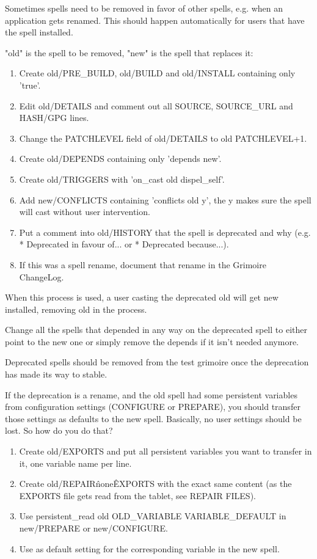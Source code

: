 \documentclass[a4paper,10pt]{book}
\begin{document}
Sometimes spells need to be removed in favor of other spells, e.g. when an
application gets renamed. This should happen automatically for users that
have the spell installed.

"old" is the spell to be removed, "new" is the spell that replaces it:
\begin{enumerate}
\item Create old/PRE\_BUILD, old/BUILD and old/INSTALL containing only
	'true'.
\item Edit old/DETAILS and comment out all SOURCE, SOURCE\_URL and HASH/GPG
	lines.
\item Change the PATCHLEVEL field of old/DETAILS to old PATCHLEVEL+1.
\item Create old/DEPENDS containing only 'depends new'.
\item Create old/TRIGGERS with 'on\_cast old dispel\_self'.
\item Add new/CONFLICTS containing 'conflicts old y', the y makes sure the
	spell will cast without user intervention.
\item Put a comment into old/HISTORY that the spell is deprecated and why
	(e.g. * Deprecated in favour of... or * Deprecated because...).
\item If this was a spell rename, document that rename in the Grimoire
	ChangeLog.
\end{enumerate}

When this process is used, a user casting the deprecated old will get new
installed, removing old in the process.

Change all the spells that depended in any way on the deprecated spell to
either point to the new one or simply remove the depends if it isn't needed
anymore.

Deprecated spells should be removed from the test grimoire once the
deprecation has made its way to stable.

If the deprecation is a rename, and the old spell had some persistent
variables from configuration settings (CONFIGURE or PREPARE), you should
transfer those settings as defaults to the new spell. Basically, no user
settings should be lost. So how do you do that?
\begin{enumerate}
\item Create old/EXPORTS and put all persistent variables you want to
	transfer in it, one variable name per line.
\item Create old/REPAIR\^none\^EXPORTS with the exact same content (as the
	EXPORTS file gets read from the tablet, see REPAIR FILES).
\item Use persistent\_read old OLD\_VARIABLE VARIABLE\_DEFAULT in new/PREPARE
	or new/CONFIGURE.
\item Use  as default setting for
the
	corresponding variable in the new spell.
\end{enumerate}
\end{document}
